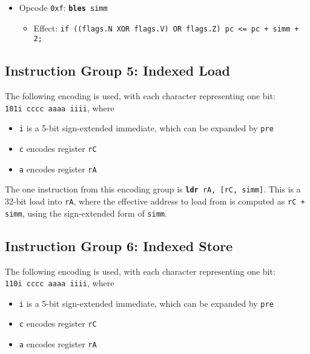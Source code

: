 \documentclass{article}
\begin{document}
\begin{itemize}
		\item Opcode \texttt{0xf}:
			\texttt{\textbf{bles} simm}
		\begin{itemize}
			\item Effect:
				\texttt{if ((flags.N XOR flags.V) OR flags.Z)
					pc <= pc + simm + 2;}
		\end{itemize}
	\end{itemize}

	\doublespacing
	\subsection{Instruction Group 5:  Indexed Load}
	The following encoding is used, with each character representing one
	bit:  \\
	\texttt{101i cccc aaaa iiii}, where

	\singlespacing
	\begin{itemize}
		\item \texttt{i} is a 5-bit sign-extended immediate, which can
		be expanded by \texttt{pre}  
		\item \texttt{c} encodes register \texttt{rC}
		\item \texttt{a} encodes register \texttt{rA}
	\end{itemize}
	\doublespacing

	The one instruction from this encoding group is
	\texttt{\textbf{ldr} rA, [rC, simm]}.
	This is a 32-bit load into \texttt{rA}, where the effective address to
	load from is computed as \texttt{rC + simm}, using the sign-extended
	form of \texttt{simm}.

	\subsection{Instruction Group 6:  Indexed Store}
	The following encoding is used, with each character representing one
	bit:  \\
	\texttt{110i cccc aaaa iiii}, where

	\singlespacing
	\begin{itemize}
		\item \texttt{i} is a 5-bit sign-extended immediate, which can
		be expanded by \texttt{pre}  
		\item \texttt{c} encodes register \texttt{rC}
		\item \texttt{a} encodes register \texttt{rA}
	\end{itemize}
	\doublespacing
\end{document}
